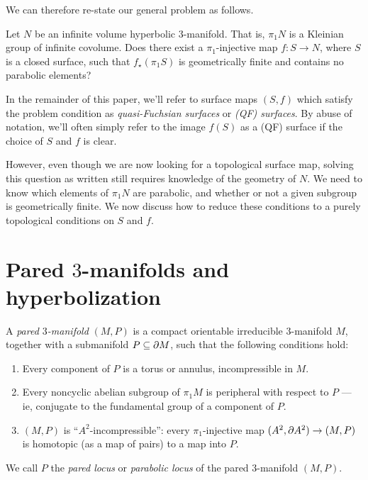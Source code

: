 We can therefore re-state our general problem as follows.

\begin{prob}

Let $N$ be an infinite volume hyperbolic $3$-manifold. That is, $\pi_1N$ is
a Kleinian group of infinite covolume. Does there exist a $\pi_1$-injective map
$f \colon S \to N$, where $S$ is a closed surface, such that $f_\star(\pi_1S)$
is geometrically finite and contains no parabolic elements?

\end{prob}

In the remainder of this paper, we'll refer to surface maps $(S,f)$ which
satisfy the problem condition as \emph{quasi-Fuchsian surfaces} or \emph{(QF)
surfaces}. By abuse of notation, we'll often simply refer to the image $f(S)$
as a (QF) surface if the choice of $S$ and $f$ is clear.

However, even though we are now looking for a topological surface map, solving
this question as written still requires knowledge of the geometry of $N$. We
need to know which elements of $\pi_1N$ are parabolic, and whether or not
a given subgroup is geometrically finite. We now discuss how to reduce these
conditions to a purely topological conditions on $S$ and $f$.

\section{Pared $3$-manifolds and hyperbolization}

\begin{defn}

A \emph{pared $3$-manifold} $(M,P)$ is a compact orientable irreducible
$3$-manifold $M$, together with a submanifold $P\subseteq\partial M$, such that the
following conditions hold:

\begin{enumerate}
\item Every component of $P$ is a torus or annulus, incompressible in $M$.

\item Every noncyclic abelian subgroup of $\pi_1M$ is peripheral with respect
to $P$ --- ie, conjugate to the fundamental group of a component of $P$.

\item $(M,P)$ is ``$A^2$-incompressible'': every $\pi_1$-injective map $(A^2,
\partial A^2) \to (M,P)$ is homotopic (as a map of pairs) to a map into $P$.

\end{enumerate}

We call $P$ the \emph{pared locus} or \emph{parabolic locus} of the pared
$3$-manifold $(M,P)$.

\end{defn}

